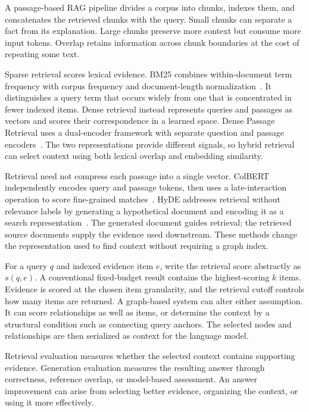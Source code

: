 A passage-based RAG pipeline divides a corpus into chunks, indexes them, and concatenates the retrieved chunks with the query. Small chunks can separate a fact from its explanation. Large chunks preserve more context but consume more input tokens. Overlap retains information across chunk boundaries at the cost of repeating some text.

Sparse retrieval scores lexical evidence. BM25 combines within-document term frequency with corpus frequency and document-length normalization~\cite{bg-bm25}. It distinguishes a query term that occurs widely from one that is concentrated in fewer indexed items. Dense retrieval instead represents queries and passages as vectors and scores their correspondence in a learned space. Dense Passage Retrieval uses a dual-encoder framework with separate question and passage encoders~\cite{bg-dpr}. The two representations provide different signals, so hybrid retrieval can select context using both lexical overlap and embedding similarity.

Retrieval need not compress each passage into a single vector. ColBERT independently encodes query and passage tokens, then uses a late-interaction operation to score fine-grained matches~\cite{lit-khattab2020colbert}. HyDE addresses retrieval without relevance labels by generating a hypothetical document and encoding it as a search representation~\cite{lit-gao2023hyde}. The generated document guides retrieval; the retrieved source documents supply the evidence used downstream. These methods change the representation used to find context without requiring a graph index.

For a query $q$ and indexed evidence item $e$, write the retrieval score abstractly as $s(q,e)$. A conventional fixed-budget result contains the highest-scoring $k$ items. Evidence is scored at the chosen item granularity, and the retrieval cutoff controls how many items are returned. A graph-based system can alter either assumption. It can score relationships as well as items, or determine the context by a structural condition such as connecting query anchors. The selected nodes and relationships are then serialized as context for the language model.

Retrieval evaluation measures whether the selected context contains supporting evidence. Generation evaluation measures the resulting answer through correctness, reference overlap, or model-based assessment. An answer improvement can arise from selecting better evidence, organizing the context, or using it more effectively.

